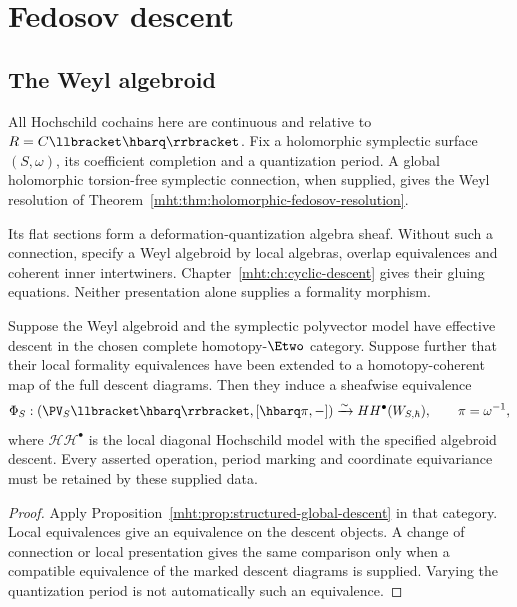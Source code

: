 \chapter{Fedosov descent}
\section{The Weyl algebroid}
All Hochschild cochains here are continuous and relative to
\(R=\C\llbracket\hbarq\rrbracket\). Fix a holomorphic symplectic
surface \((S,\omega)\), its coefficient completion and a
quantization period. A global holomorphic torsion-free symplectic
connection, when supplied, gives the Weyl resolution of
Theorem~\ref{mht:thm:holomorphic-fedosov-resolution}.

Its flat
sections form a deformation-quantization algebra sheaf.
Without such a connection, specify a Weyl algebroid by local
algebras, overlap equivalences and coherent inner intertwiners.
Chapter~\ref{mht:ch:cyclic-descent} gives their gluing equations.
Neither presentation alone supplies a formality morphism.

\begin{theorem}
Suppose the Weyl algebroid and the symplectic polyvector model have
effective descent in the chosen complete homotopy-\(\Etwo\) category.
Suppose further that their local formality equivalences have been
extended to a homotopy-coherent map of the full descent diagrams.
Then they induce a sheafwise equivalence
\[
 \Phi_S:
 (\PV_S\llbracket\hbarq\rrbracket,[\hbarq\pi,-])
 \xrightarrow{\sim}
 \mathcal{HH}^{\bullet}(\mathcal W_{S,\hbar}),
 \qquad \pi=\omega^{-1},
\]
where \(\mathcal{HH}^{\bullet}\) is the local diagonal Hochschild
model with the specified algebroid descent. Every asserted operation,
period marking and coordinate equivariance must be retained by
these supplied data.
\end{theorem}
\begin{proof}
Apply Proposition~\ref{mht:prop:structured-global-descent} in that
category. Local equivalences give an equivalence on the descent
objects. A change of connection or local presentation gives the
same comparison only when a compatible equivalence of the marked
descent diagrams is supplied. Varying the quantization period is
not automatically such an equivalence.
\end{proof}

